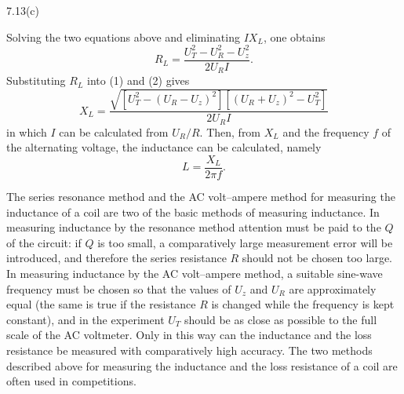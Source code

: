 \begin{figbox}{7.13(c)}
\end{figbox}

Solving the two equations above and eliminating $IX_L$, one obtains
\[
R_L=\frac{U_T^2-U_R^2-U_z^2}{2U_RI}.
\]
Substituting $R_L$ into (1) and (2) gives
\begin{equation}
X_L=\frac{\sqrt{\left[U_T^2-(U_R-U_z)^2\right]\left[(U_R+U_z)^2-U_T^2\right]}}{2U_RI} \tag{3}
\end{equation}
in which $I$ can be calculated from $U_R/R$. Then, from $X_L$ and the frequency $f$ of the alternating voltage, the inductance can be calculated, namely
\begin{equation}
L=\frac{X_L}{2\pi f}. \tag{4}
\end{equation}

\begin{commentary}
The series resonance method and the AC volt--ampere method for measuring the inductance of a coil are two of the basic methods of measuring inductance. In measuring inductance by the resonance method attention must be paid to the $Q$ of the circuit: if $Q$ is too small, a comparatively large measurement error will be introduced, and therefore the series resistance $R$ should not be chosen too large. In measuring inductance by the AC volt--ampere method, a suitable sine-wave frequency must be chosen so that the values of $U_z$ and $U_R$ are approximately equal (the same is true if the resistance $R$ is changed while the frequency is kept constant), and in the experiment $U_T$ should be as close as possible to the full scale of the AC voltmeter. Only in this way can the inductance and the loss resistance be measured with comparatively high accuracy. The two methods described above for measuring the inductance and the loss resistance of a coil are often used in competitions.
\end{commentary}

